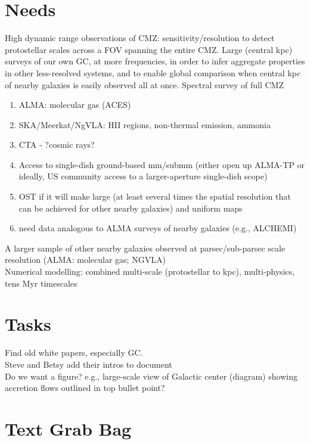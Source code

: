 \documentclass{aastex62}
\begin{document}
\section{Needs}
High dynamic range observations of CMZ: sensitivity/resolution to detect protostellar scales across a FOV spanning the entire CMZ. Large (central kpc) surveys of our own GC, at more frequencies, in order to infer aggregate properties in other less-resolved systems, and to enable global comparison when central kpc of nearby galaxies is easily observed all at once. Spectral survey of full CMZ
\begin{enumerate}
    \item ALMA: molecular gas (ACES)
    \item SKA/Meerkat/NgVLA: HII regions, non-thermal emission, ammonia
    \item CTA - ?cosmic rays?
    \item Access to single-dish ground-based mm/submm  (either open up ALMA-TP or ideally, US community access to a larger-aperture single-dish scope)
    \item OST if it will make large (at least several times the spatial resolution that can be achieved for other nearby galaxies)  and uniform maps
    \item need data analogous to ALMA surveys of nearby galaxies (e.g., ALCHEMI)
\end{enumerate}
A larger sample of other nearby galaxies observed at parsec/sub-parsec scale resolution (ALMA: molecular gas; NGVLA)\\
Numerical modelling: combined multi-scale (protostellar to kpc), multi-physics, tens Myr timescales

\section{Tasks}
Find old white papers, especially GC. \\
Steve and Betsy add their intros to document\\


Do we want a figure?  e.g., large-scale view of Galactic center (diagram) showing accretion flows outlined in top bullet point? \\


\section{Text Grab Bag}
\end{document}
